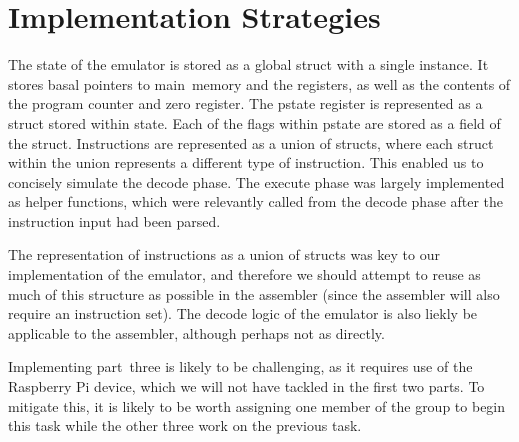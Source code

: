 \documentclass[11pt]{article}
\begin{document}
\section{Implementation Strategies}
The state of the emulator is stored as a global struct with a single instance. It stores basal pointers to 
main~memory and the registers, as well as the contents of the program counter and zero register. The pstate
register is represented as a struct stored within state. Each of the flags within pstate are stored as a field
of the struct. Instructions are represented as a union of structs, where each struct within the union represents
a different type of instruction. This enabled us to concisely simulate the decode phase. The execute phase was
largely implemented as helper functions, which were relevantly called from the decode phase after the instruction
input had been parsed. 

The representation of instructions as a union of structs was key to our implementation of the emulator, and
therefore we should attempt to reuse as much of this structure as possible in the assembler (since the assembler
will also require an instruction set). The decode logic of the emulator is also liekly be applicable to the assembler,
although perhaps not as directly.

Implementing part~three is likely to be challenging, as it requires use of the Raspberry Pi device, which we
will not have tackled in the first two parts. To mitigate this, it is likely to be worth assigning one member
of the group to begin this task while the other three work on the previous task. 
\end{document}
